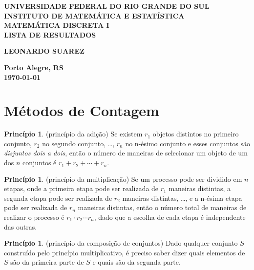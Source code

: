 \documentclass[12pt]{article}
\theoremstyle{plain}
\theoremstyle{definition}
\newtheorem{prcp}[thm]{Princípio}
\theoremstyle{remark}
\begin{document}
\begin{center}
    \textbf{\large UNIVERSIDADE FEDERAL DO RIO GRANDE DO SUL} \\
    \textbf{\large INSTITUTO DE MATEMÁTICA E ESTATÍSTICA} \\
    \vspace{3cm}
    \textbf{\Large MATEMÁTICA DISCRETA I} \\
    \vspace{1cm}
    \textbf{\large LISTA DE RESULTADOS} \\
    \vspace{3cm}

    \textbf{LEONARDO SUAREZ}

    \vfill
    \textbf{\large Porto Alegre, RS} \\
    \textbf{\large \today}
\end{center}

\newpage
\tableofcontents
\newpage

\section{Métodos de Contagem}
\begin{prcp} (princípio da adição)
    Se existem \(r_1\) objetos distintos no primeiro conjunto, \(r_2\) no segundo conjunto, \ldots, \(r_n\) no n-ésimo conjunto e esses conjuntos são \emph{disjuntos dois a dois}, então o número de maneiras de selecionar um objeto de um dos \(n\) conjuntos é \(r_1 + r_2 + \cdots + r_n\).
\end{prcp}

\begin{prcp} (princípio da multiplicação)
    Se um processo pode ser dividido em \(n\) etapas, onde a primeira etapa pode ser realizada de \(r_1\) maneiras distintas, a segunda etapa pode ser realizada de \(r_2\) maneiras distintas, \ldots, e a n-ésima etapa pode ser realizada de \(r_n\) maneiras distintas, então o número total de maneiras de realizar o processo é \(r_1 \cdot r_2 \cdots r_n\), dado que a escolha de cada etapa é independente das outras.
\end{prcp}

\begin{prcp} (princípio da composição de conjuntos)
    Dado qualquer conjunto \(S\) construído pelo princípio multiplicativo, é preciso saber dizer quais elementos de \(S\) são da primeira parte de \(S\) e quais são da segunda parte.
\end{prcp}
\end{document}

